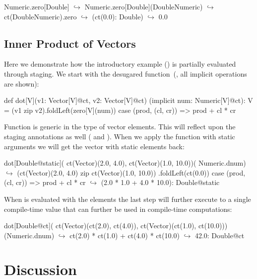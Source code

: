 \begin{lstparagraph}
Numeric.zero[Double]
  $\hookrightarrow$ Numeric.zero[Double](DoubleNumeric)
  $\hookrightarrow$ ct(DoubleNumeric).zero
  $\hookrightarrow$ (ct(0.0): Double)
  $\hookrightarrow$ 0.0
\end{lstparagraph}

\subsection{Inner Product of Vectors}
\label{sct:dot-product}

Here we demonstrate how the introductory example () is
partially evaluated through staging. We start with the desugared 
function~(\ie, all implicit operations are shown):

\begin{lstparagraph}
 def dot[V](v1: Vector[V]@ct, v2: Vector[V]@ct)
  (implicit num: Numeric[V]@ct): V =
  (v1 zip v2).foldLeft(zero[V](num)) {
    case (prod, (cl, cr)) => prod + cl * cr
  }
\end{lstparagraph}

Function  is generic in the type of vector elements. This will reflect
upon the staging annotations as well ( and ). When we apply the
 function with static arguments we will get the vector with static elements back:

\begin{lstparagraph}
dot[Double@static](
  ct(Vector)(2.0, 4.0), ct(Vector)(1.0, 10.0))(
  Numeric.dnum)
$\hookrightarrow$
  (ct(Vector)(2.0, 4.0) zip ct(Vector)(1.0, 10.0))
    .foldLeft(ct(0.0)) {
      case (prod, (cl, cr)) => prod + cl * cr
    }
$\hookrightarrow$ (2.0 * 1.0 + 4.0 * 10.0): Double@static
\end{lstparagraph}

When  is evaluated with the  elements the last step will further
execute to a single compile-time value that can further be used in compile-time computations:
\begin{lstparagraph}
dot[Double@ct](
  ct(Vector)(ct(2.0), ct(4.0)),
  ct(Vector)(ct(1.0), ct(10.0)))(Numeric.dnum)
$\hookrightarrow$ ct(2.0) * ct(1.0) + ct(4.0) * ct(10.0)
$\hookrightarrow$ 42.0: Double@ct
\end{lstparagraph}



\section{Discussion}
\label{sct:discussion}

